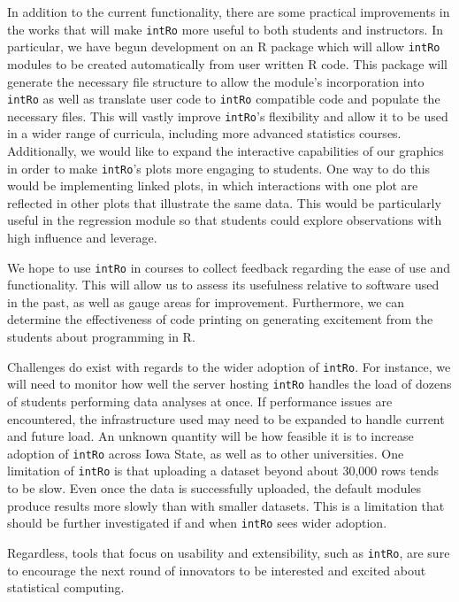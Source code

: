 \documentclass[12pt,]{article}
\begin{document}
In addition to the current functionality, there are some practical
improvements in the works that will make \texttt{intRo} more useful to
both students and instructors. In particular, we have begun development
on an R package which will allow \texttt{intRo} modules to be created
automatically from user written R code. This package will generate the
necessary file structure to allow the module's incorporation into
\texttt{intRo} as well as translate user code to \texttt{intRo}
compatible code and populate the necessary files. This will vastly
improve \texttt{intRo}'s flexibility and allow it to be used in a wider
range of curricula, including more advanced statistics courses.
Additionally, we would like to expand the interactive capabilities of
our graphics in order to make \texttt{intRo}'s plots more engaging to
students. One way to do this would be implementing linked plots, in
which interactions with one plot are reflected in other plots that
illustrate the same data. This would be particularly useful in the
regression module so that students could explore observations with high
influence and leverage.

We hope to use \texttt{intRo} in courses to collect feedback regarding
the ease of use and functionality. This will allow us to assess its
usefulness relative to software used in the past, as well as gauge areas
for improvement. Furthermore, we can determine the effectiveness of code
printing on generating excitement from the students about programming in
R.

Challenges do exist with regards to the wider adoption of
\texttt{intRo}. For instance, we will need to monitor how well the
server hosting \texttt{intRo} handles the load of dozens of students
performing data analyses at once. If performance issues are encountered,
the infrastructure used may need to be expanded to handle current and
future load. An unknown quantity will be how feasible it is to increase
adoption of \texttt{intRo} across Iowa State, as well as to other
universities. One limitation of \texttt{intRo} is that uploading a
dataset beyond about 30,000 rows tends to be slow. Even once the data is
successfully uploaded, the default modules produce results more slowly
than with smaller datasets. This is a limitation that should be further
investigated if and when \texttt{intRo} sees wider adoption.

Regardless, tools that focus on usability and extensibility, such as
\texttt{intRo}, are sure to encourage the next round of innovators to be
interested and excited about statistical computing.
\end{document}

